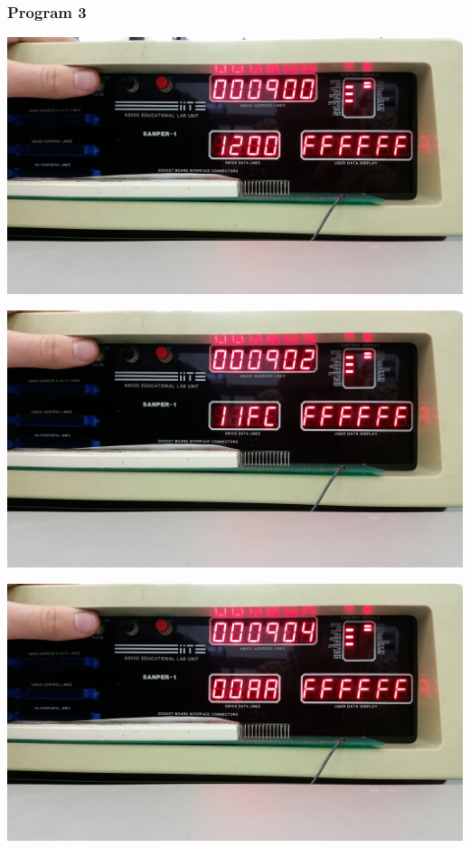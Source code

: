 \documentclass[12pt, twocolumn]{article}
\begin{document}
\subsubsection{Program 3}
\begin{center}
\includegraphics[width=1\linewidth]{Lab1/20150120_094638}
\end{center}
\begin{center}
\includegraphics[width=1\linewidth]{Lab1/20150120_094640}
\end{center}
\begin{center}
\includegraphics[width=1\linewidth]{Lab1/20150120_094642}
\end{center}
\end{document}
